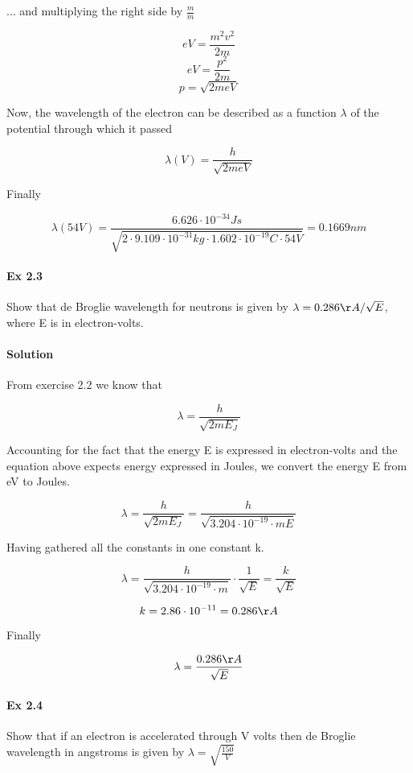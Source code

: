\documentclass{article}
\begin{document}
... and multiplying the right side by $\frac{m}{m}$

\[e V = \frac{m^2v^2}{2m}\]
\[e V = \frac{p^2}{2m}\]
\[p = \sqrt{2 m e V}\]

Now, the wavelength of the electron can be described as a function $\lambda$ of the potential through which it passed

\[\lambda (V) = \frac{h}{\sqrt{2 m e V}}\]

Finally

\[\lambda (54V) = \frac{6.626 \cdot 10^{-34} Js}{\sqrt{2 \cdot 9.109 \cdot 10^{-31} kg \cdot 1.602 \cdot 10^{-19} C \cdot 54V}} = 0.1669 nm\]


\paragraph{Ex 2.3}
Show that de Broglie wavelength for neutrons is given by $\lambda = 0.286 \AA / \sqrt{E}$, where E is in electron-volts.
\paragraph{Solution}

From exercise 2.2 we know that

\[\lambda = \frac{h}{\sqrt{2 m E_{J}}}\]

Accounting for the fact that the energy E is expressed in electron-volts and the equation above expects energy expressed in Joules, we convert the energy E  from eV to Joules.

\[\lambda = \frac{h}{\sqrt{2 m E_{J}}} =  \frac{h}{\sqrt{3.204 \cdot 10^{-19} \cdot m E}}\]

Having gathered all the constants in one constant k.

\[\lambda = \frac{h}{\sqrt{3.204 \cdot 10^{-19} \cdot m}} \cdot \frac{1}{\sqrt{E}} = \frac{k}{\sqrt{E}}\]

\[k = 2.86 \cdot 10^{-11} = 0.286 \AA\]

Finally

\[\lambda = \frac{0.286 \AA}{\sqrt{E}}\]


\paragraph{Ex 2.4}
Show that if an electron is accelerated through V volts then de Broglie wavelength in angstroms is given by $\lambda = \sqrt{\frac{150}{V}}$
\end{document}
